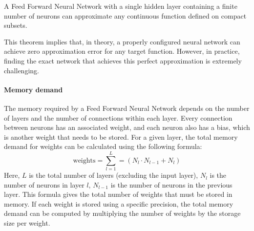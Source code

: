 \begin{theorem}
    A Feed Forward Neural Network with a single hidden layer containing a finite number of neurons can approximate any continuous function defined on compact subsets.
\end{theorem}
\noindent This theorem implies that, in theory, a properly configured neural network can achieve zero approximation error for any target function. 
However, in practice, finding the exact network that achieves this perfect approximation is extremely challenging.

\paragraph*{Memory demand}
The memory required by a Feed Forward Neural Network depends on the number of layers and the number of connections within each layer. 
Every connection between neurons has an associated weight, and each neuron also has a bias, which is another weight that needs to be stored.
For a given layer, the total memory demand for weights can be calculated using the following formula:
\[\text{weights}=\sum_{l=1}^{L}=(N_l\cdot N_{l-1}+N_l)\]
Here, $L$ is the total number of layers (excluding the input layer), $N_l$ is the number of neurons in layer $l$, $N_{l-1}$ is the number of neurons in the previous layer. 
This formula gives the total number of weights that must be stored in memory. 
If each weight is stored using a specific precision, the total memory demand can be computed by multiplying the number of weights by the storage size per weight.